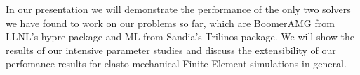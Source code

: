 \documentclass{report}
\begin{document}
In our presentation we will demonstrate the performance of the only two
solvers we have found to work on our problems so far, which are BoomerAMG
from LLNL's hypre package and ML from Sandia's Trilinos package. We will
show the results of our intensive parameter studies and discuss the
extensibility of our perfomance results for elasto-mechanical Finite
Element simulations in general.
\end{document}

